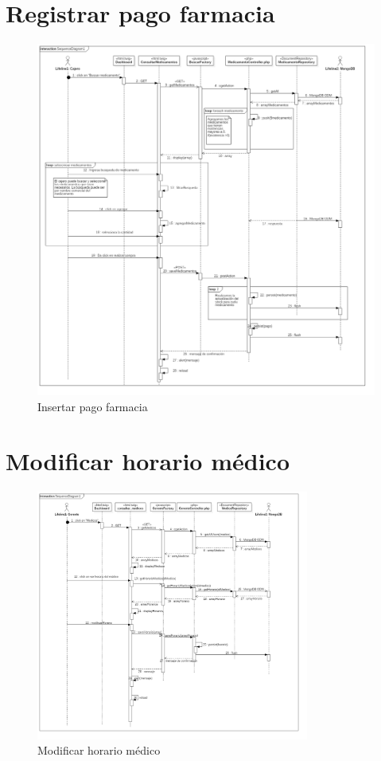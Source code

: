 \section{Registrar pago farmacia}
\begin{figure}[htbp!]
		\centering
			\includegraphics[width=1\textwidth]{uml/DiagramasSecuencia/Trujillo/insertPagoMedicina}
		\caption{Insertar pago farmacia}
	\end{figure}
	\newpage
\section{Modificar horario médico}
\begin{figure}[htbp!]
		\centering
			\includegraphics[width=0.8\textwidth]{uml/DiagramasSecuencia/Trujillo/uptHorario}
		\caption{Modificar horario médico}
	\end{figure}
	\newpage

